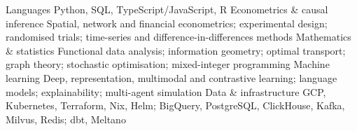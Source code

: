 \begin{cvskills}
  \cvskill
  {Languages}
  {Python, SQL, TypeScript/JavaScript, R}
  \cvskill
  {Econometrics \& causal inference}
  {Spatial, network and financial econometrics; experimental design;
  randomised trials; time-series and difference-in-differences methods}
  \cvskill
  {Mathematics \& statistics}
  {Functional data analysis; information geometry; optimal transport;
  graph theory; stochastic optimisation; mixed-integer programming}
  \cvskill
  {Machine learning}
  {Deep, representation, multimodal and contrastive learning;
  language models; explainability; multi-agent simulation}
  \cvskill
  {Data \& infrastructure}
  {GCP, Kubernetes, Terraform, Nix, Helm; BigQuery, PostgreSQL,
  ClickHouse, Kafka, Milvus, Redis; dbt, Meltano}
\end{cvskills}
